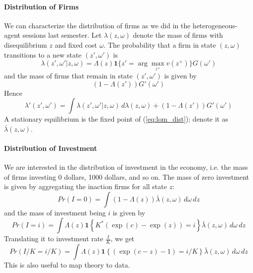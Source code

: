 \documentclass[12pt]{article}
\begin{document}
\paragraph{Distribution of Firms \\ [6pt]}

We can characterize the distribution of firms as we did in the heterogeneous-agent sessions last semester. Let $\lambda(z, \omega)$ denote the mass of firms with disequilibrium $z$ and fixed cost $\omega$. The probability that a firm in state $(z, \omega)$ transitions to a new state $(z',\omega')$ is 
\begin{equation}
	\lambda(z', \omega'|z,\omega) = \Lambda(z) \mathbf{1}\{z' = \arg \max_{z^+} v(z^+)\} G(\omega')
\end{equation} 
and the mass of firms that remain in state $(z', \omega')$ is given by
\[(1-\Lambda(z')) G'(\omega')\]
Hence
\begin{equation} \label{eq:lom_dist}
	\lambda'(z', \omega') = \int \lambda(z', \omega'|z,\omega) \, d\lambda(z, \omega) + (1-\Lambda(z')) G'(\omega')
\end{equation}
A stationary equilibrium is the fixed point of (\ref{eq:lom_dist}); denote it as $\bar{\lambda}(z, \omega)$. 


\paragraph{Distribution of Investment \\ [6pt]}
We are interested in the distribution of investment in the economy, i.e. the mass of firms investing 0 dollars, 1000 dollars, and so on. The mass of zero investment is given by aggregating the inaction firms for all state $z$:
\begin{equation}
	Pr(I = 0) = \int (1-\Lambda(z)) \bar{\lambda}(z, \omega) \,d\omega \,dz 
\end{equation}
and the mass of investment being $i$ is given by
\begin{equation*}
	Pr(I = i) = \int \Lambda(z) \mathbf{1} \left\{K^*(\exp(c) - \exp(z)) = i \right\}  \bar{\lambda}(z, \omega) \,d\omega \, dz
\end{equation*}
Translating it to investment rate $\frac{I}{K}$, we get
\begin{equation}
	Pr(I/K = i/K) = \int \Lambda(z) \mathbf{1} \left\{(\exp(c-z) - 1) = i/K \right\}  \bar{\lambda}(z, \omega) \,d\omega \, dz
\end{equation}
This is also useful to map theory to data.
\end{document}
